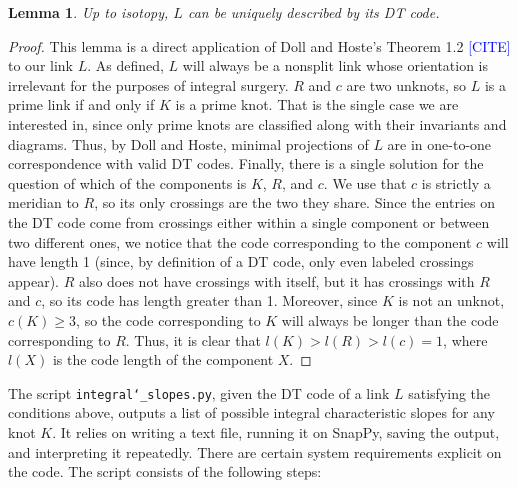 \documentclass[11pt,usenames,dvipsnames,reqno]{amsart}
\numberwithin{theorem}{section}
\newtheorem{lemma}[theorem]{Lemma}
\theoremstyle{ex}
\theoremstyle{rem}
\def\kh#1{\textcolor{Blue}{#1}}
\begin{document}
\begin{lemma}
	Up to isotopy, $L$ can be uniquely described by its DT code.
\end{lemma}
\begin{proof}
	This lemma is a direct application of Doll and Hoste's Theorem 1.2 \kh{[CITE]} to our link $L$. As defined, $L$ will always be a nonsplit link whose orientation is irrelevant for the purposes of integral surgery. $R$ and $c$ are two unknots, so $L$ is a prime link if and only if $K$ is a prime knot. That is the single case we are interested in, since only prime knots are classified along with their invariants and diagrams. Thus, by Doll and Hoste, minimal projections of $L$ are in one-to-one correspondence with valid DT codes.
	Finally, there is a single solution for the question of which of the components is $K$, $R$, and $c$. We use that $c$ is strictly a meridian to $R$, so its only crossings are the two they share. Since the entries on the DT code come from crossings either within a single component or between two different ones, we notice that the code corresponding to the component $c$ will have length 1 (since, by definition of a DT code, only even labeled crossings appear). $R$ also does not have crossings with itself, but it has crossings with $R$ and $c$, so its code has length greater than 1. Moreover, since $K$ is not an unknot, $c(K) \geq 3$, so the code corresponding to $K$ will always be longer than the code corresponding to $R$. Thus, it is clear that $l(K) > l(R) > l(c) = 1$, where $l(X)$ is the code length of the component $X$.
\end{proof}

The script \texttt{integral\char`_slopes.py}, given the DT code of a link $L$ satisfying the conditions above, outputs a list of possible integral characteristic slopes for any knot $K$. It relies on writing a text file, running it on SnapPy, saving the output, and interpreting it repeatedly. There are certain system requirements explicit on the code. The script consists of the following steps:
\end{document}
